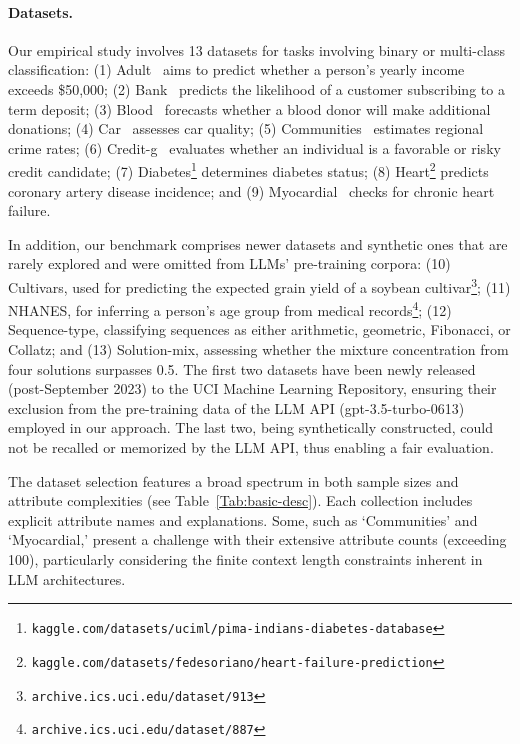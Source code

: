 \paragraph{Datasets.}
Our empirical study involves 13 datasets for tasks involving binary or multi-class classification: (1) Adult~\cite{asuncion2007uci} aims to predict whether a person's yearly income exceeds \$50,000; (2) Bank~\cite{moro2014data} predicts the likelihood of a customer subscribing to a term deposit; (3) Blood~\cite{yeh2009knowledge} forecasts whether a blood donor will make additional donations; (4) Car~\cite{kadra2021well} assesses car quality; (5) Communities~\cite{misc_communities_and_crime_183} estimates regional crime rates; (6) Credit-g~\cite{kadra2021well} evaluates whether an individual is a favorable or risky credit candidate; (7) Diabetes\footnote{\texttt{kaggle.com/datasets/uciml/pima-indians-diabetes-database}} determines diabetes status; (8) Heart\footnote{\texttt{kaggle.com/datasets/fedesoriano/heart-failure-prediction}} predicts coronary artery disease incidence; and (9) Myocardial~\cite{misc_myocardial_infarction_complications_579} checks for chronic heart failure. 

In addition, our benchmark comprises newer datasets and synthetic ones that are rarely explored and were omitted from LLMs’ pre-training corpora: (10) Cultivars, used for predicting the expected grain yield of a soybean cultivar\footnote{\texttt{archive.ics.uci.edu/dataset/913}}; (11) NHANES, for inferring a person’s age group from medical records\footnote{\texttt{archive.ics.uci.edu/dataset/887}}; (12) Sequence-type, classifying sequences as either arithmetic, geometric, Fibonacci, or Collatz; and (13) Solution-mix, assessing whether the mixture concentration from four solutions surpasses 0.5. The first two datasets have been newly released (post-September 2023) to the UCI Machine Learning Repository, ensuring their exclusion from the pre-training data of the LLM API (gpt-3.5-turbo-0613) employed in our approach. The last two, being synthetically constructed, could not be recalled or memorized by the LLM API, thus enabling a fair evaluation.

The dataset selection features a broad spectrum in both sample sizes and attribute complexities (see Table~\ref{Tab:basic-desc}). Each collection includes explicit attribute names and explanations. Some, such as `Communities' and `Myocardial,' present a challenge with their extensive attribute counts (exceeding 100), particularly considering the finite context length constraints inherent in LLM architectures.

